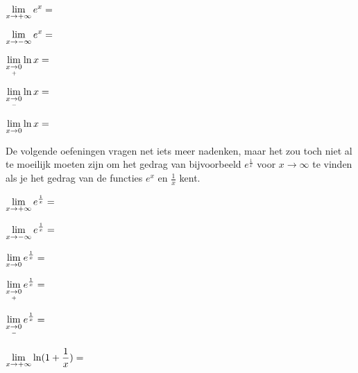\documentclass{ximera}
\begin{document}
\begin{exercise}
		\begin{question} \def\isA{correct}   $\limxi    e^x = \;$            \localoefoptions \end{question}
		\begin{question} \def\isB{correct}   $\limxmi   e^x = \;$            \localoefoptions \end{question}
		\begin{question} \def\isB{correct}   $\rlimx    \ln x = \;$          \localoefoptions \end{question}
			{\reversemarginpar\marginpar{\Smiley}}
		\begin{question} \def\isE{correct}   $\llimx    \ln x = \;$          \localoefoptions \end{question}
		\begin{question} \def\isE{correct}   $\limxz    \ln x = \;$          \localoefoptions \end{question}
		De volgende oefeningen vragen net iets meer nadenken, maar het zou toch niet al te moeilijk moeten zijn om het gedrag van bijvoorbeeld $e^{\frac1x}$ voor $x\to\infty$ te vinden als je het gedrag van de functies $e^x$ en $\frac1x$ kent.				
		\begin{question} \def\isD{correct}   $\limxi    e^{\frac 1x} = \;$   \localoefoptions \end{question}
		\begin{question} \def\isC{correct}   $\limxmi   e^{\frac 1x} = \;$   \localoefoptions \end{question}
		\begin{question} \def\isE{correct}   $\limxz     e^{\frac 1x} = \;$   \localoefoptions \end{question}
		\begin{question} \def\isA{correct}   $\rlimx    e^{\frac 1x} = \;$   \localoefoptions \end{question}
		\begin{question} \def\isC{correct}   $\llimx    e^{\frac 1x} = \;$   \localoefoptions \end{question}
		\begin{question} \def\isC{correct}   $\limxi    \ln(1+ \frac 1x) = \;$ \localoefoptions \end{question}
		
\end{exercise}
\end{document}
